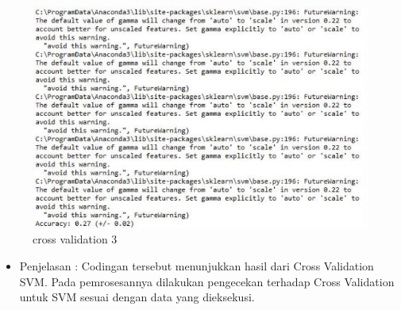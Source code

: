 \begin{enumerate}
\begin{itemize}
\begin{figure}[ht]
\includegraphics[scale=0.2]{figures/cross3.jpg}
\caption{cross validation 3}
\label{contoh}
\end{figure}
\par
\begin{itemize}
\item Penjelasan : Codingan tersebut menunjukkan hasil dari Cross Validation SVM. Pada pemrosesannya dilakukan pengecekan terhadap Cross Validation untuk SVM sesuai dengan data yang dieksekusi.
\par
\par
\end{itemize}
\end{itemize}






\end{enumerate}
